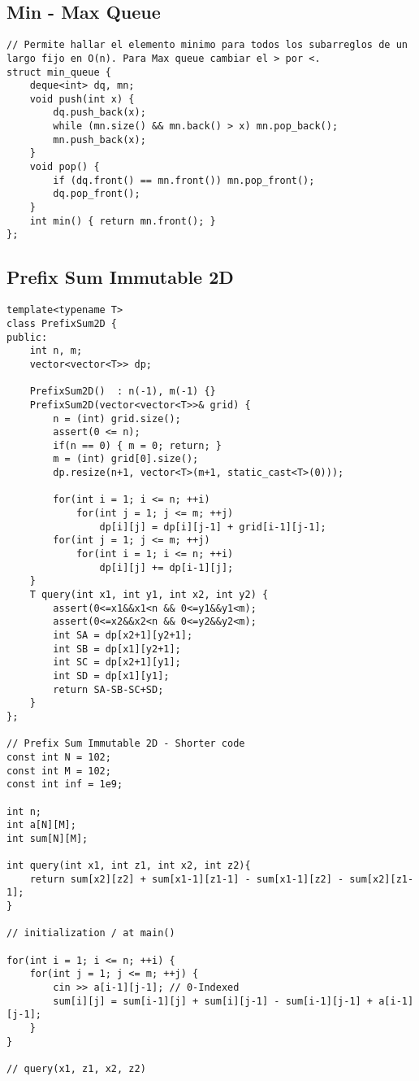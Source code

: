 \documentclass[10pt,letterpaper,twocolumn,twosided]{article}
\begin{document}
\subsection{Min - Max Queue}
\begin{lstlisting}
// Permite hallar el elemento minimo para todos los subarreglos de un largo fijo en O(n). Para Max queue cambiar el > por <.
struct min_queue {
    deque<int> dq, mn;
    void push(int x) {
        dq.push_back(x);
        while (mn.size() && mn.back() > x) mn.pop_back();
        mn.push_back(x);
    }
    void pop() {
        if (dq.front() == mn.front()) mn.pop_front();
        dq.pop_front();
    }
    int min() { return mn.front(); }
};
\end{lstlisting}

\vfill

\subsection{Prefix Sum Immutable 2D}
\begin{lstlisting}
template<typename T>
class PrefixSum2D {
public:
    int n, m;
    vector<vector<T>> dp;

    PrefixSum2D()  : n(-1), m(-1) {}
    PrefixSum2D(vector<vector<T>>& grid) {
        n = (int) grid.size();
        assert(0 <= n);
        if(n == 0) { m = 0; return; }
        m = (int) grid[0].size();
        dp.resize(n+1, vector<T>(m+1, static_cast<T>(0)));
        
        for(int i = 1; i <= n; ++i)
            for(int j = 1; j <= m; ++j)
                dp[i][j] = dp[i][j-1] + grid[i-1][j-1];
        for(int j = 1; j <= m; ++j)
            for(int i = 1; i <= n; ++i)
                dp[i][j] += dp[i-1][j];
    }
    T query(int x1, int y1, int x2, int y2) {
        assert(0<=x1&&x1<n && 0<=y1&&y1<m);
        assert(0<=x2&&x2<n && 0<=y2&&y2<m);
        int SA = dp[x2+1][y2+1];
        int SB = dp[x1][y2+1];
        int SC = dp[x2+1][y1];
        int SD = dp[x1][y1];
        return SA-SB-SC+SD;
    }
};

// Prefix Sum Immutable 2D - Shorter code
const int N = 102;
const int M = 102;
const int inf = 1e9;

int n;
int a[N][M];
int sum[N][M];

int query(int x1, int z1, int x2, int z2){
    return sum[x2][z2] + sum[x1-1][z1-1] - sum[x1-1][z2] - sum[x2][z1-1];
}

// initialization / at main()

for(int i = 1; i <= n; ++i) {
    for(int j = 1; j <= m; ++j) {
        cin >> a[i-1][j-1]; // 0-Indexed
        sum[i][j] = sum[i-1][j] + sum[i][j-1] - sum[i-1][j-1] + a[i-1][j-1];
    }
}

// query(x1, z1, x2, z2)
\end{lstlisting}
\end{document}
